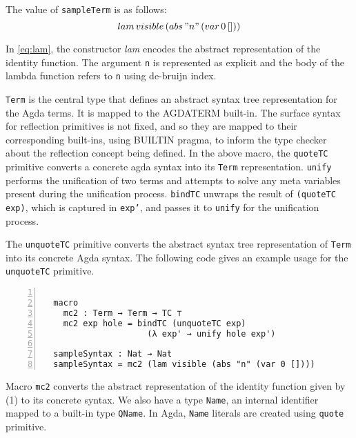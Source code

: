 \documentclass[sigplan,10pt]{acmart}
\begin{document}
\normalsize

The value of {\tt sampleTerm} is as follows: 
\begin{equation} \label{eq:lam}
	lam \, visible \, (abs \, "n" \, (var \, 0 \, []))
\end{equation}

In \eqref{eq:lam}, the constructor \emph{lam} encodes the abstract representation of the identity function. The argument {\tt n} is represented as explicit and the body of the lambda function refers to {\tt n} using de-bruijn index.   

{\tt Term} is the central type that defines an abstract syntax tree representation for the Agda terms. It is mapped to the AGDATERM built-in. The surface syntax for reflection primitives is not fixed, and so they are mapped to their corresponding built-ins, using BUILTIN pragma, to inform the type checker about the reflection concept being defined. In the above macro, the {\tt quoteTC} primitive converts a concrete agda syntax into its {\tt Term} representation. {\tt unify} performs the unification of two terms and attempts to solve any meta variables present during the unification process. {\tt bindTC} unwraps the result of {\tt (quoteTC exp)}, which is captured in {\tt exp'}, and passes it to {\tt unify} for the unification process.

The {\tt unquoteTC} primitive converts the abstract syntax tree representation of {\tt Term} into its concrete Agda syntax. The following code gives an example usage for the {\tt unquoteTC} primitive.

\begin{center}
\begingroup
\fontsize{7pt}{9pt}\selectfont
\begin{Verbatim}[frame = lines, rulecolor=\color{blue}, numbers = left, numbersep = 0pt]

  macro
    mc2 : Term → Term → TC ⊤
    mc2 exp hole = bindTC (unquoteTC exp) 
                     (λ exp' → unify hole exp')

  sampleSyntax : Nat → Nat
  sampleSyntax = mc2 (lam visible (abs "n" (var 0 [])))

\end{Verbatim}
\endgroup
\end{center}

\normalsize

Macro {\tt mc2} converts the abstract representation of the identity function given by (1) to its concrete syntax. We also have a type {\tt Name}, an internal identifier mapped to a built-in type {\tt QName}. In Agda, {\tt Name} literals are created using {\tt quote} primitive.
\end{document}
